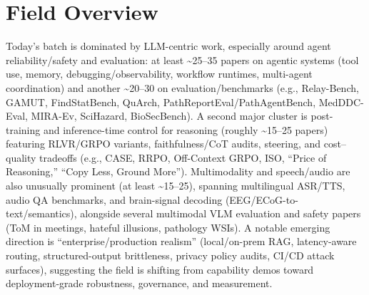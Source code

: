 \documentclass[12pt,letterpaper]{article}
\begin{document}
\medskip



\section*{Field Overview}
{\footnotesize Today's batch is dominated by LLM-centric work, especially around agent reliability/safety and evaluation: at least \textasciitilde{}25--35 papers on agentic systems (tool use, memory, debugging/observability, workflow runtimes, multi-agent coordination) and another \textasciitilde{}20--30 on evaluation/benchmarks (e.g., Relay-Bench, GAMUT, FindStatBench, QuArch, PathReportEval/PathAgentBench, MedDDC-Eval, MIRA-Ev, SciHazard, BioSecBench). A second major cluster is post-training and inference-time control for reasoning (roughly \textasciitilde{}15--25 papers) featuring RLVR/GRPO variants, faithfulness/CoT audits, steering, and cost--quality tradeoffs (e.g., CASE, RRPO, Off-Context GRPO, ISO, ``Price of Reasoning,'' ``Copy Less, Ground More''). Multimodality and speech/audio are also unusually prominent (at least \textasciitilde{}15--25), spanning multilingual ASR/TTS, audio QA benchmarks, and brain-signal decoding (EEG/ECoG-to-text/semantics), alongside several multimodal VLM evaluation and safety papers (ToM in meetings, hateful illusions, pathology WSIs). A notable emerging direction is ``enterprise/production realism'' (local/on-prem RAG, latency-aware routing, structured-output brittleness, privacy policy audits, CI/CD attack surfaces), suggesting the field is shifting from capability demos toward deployment-grade robustness, governance, and measurement.}
\end{document}
